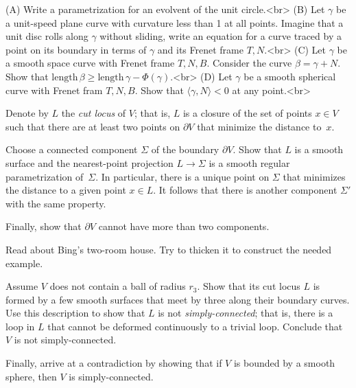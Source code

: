 (A) Write a parametrization for an evolvent of the unit circle.<br>
(B) Let \(\gamma\) be a unit-speed plane curve with curvature less than 1 at all points.
Imagine that a unit disc rolls along $\gamma$ without sliding, write an equation for a curve traced by a point on its boundary in terms of \(\gamma\) and its Frenet frame \(T,N\).<br>
(C) Let \(\gamma\) be a smooth space curve with Frenet frame \(T,N,B\).
Consider the curve \(\beta=\gamma+N\).
Show that \(\mathrm{length}\,\beta\ge \mathrm{length}\,\gamma-\Phi(\gamma)\).<br>
(D) Let \(\gamma\) be a smooth spherical curve with Frenet fram \(T,N,B\). Show that \(\langle \gamma,N\rangle<0\) at any point.<br>

















Denote by $L$ the \emph{cut locus} of $V$;
that is, $L$ is a closure of the set of points $x\in V$ such that there are at least two points on $\partial V$ that minimize the distance to~$x$.

Choose a connected component $\Sigma$ of the boundary $\partial V$.
Show that $L$ is a smooth surface and the nearest-point projection $L\to \Sigma$ is a smooth regular parametrization of~$\Sigma$.
In particular, there is a unique point on $\Sigma$ that minimizes the distance to a given point $x\in L$.
It follows that there is another component $\Sigma'$ with the same property.

Finally, show that $\partial V$ cannot have more than two components.

Read about Bing's two-room house.
Try to thicken it to construct the needed example.

Assume $V$ does not contain a ball of radius $r_3$.
Show that its cut locus $L$ is formed by a few smooth surfaces that meet by three along their boundary curves.
Use this description to show that $L$ is not \emph{simply-connected}; that is, there is a loop in $L$ that cannot be deformed continuously to a trivial loop.
Conclude that $V$ is not simply-connected.

Finally, arrive at a contradiction by showing that if $V$ is bounded by a smooth sphere, then $V$ is simply-connected.




















